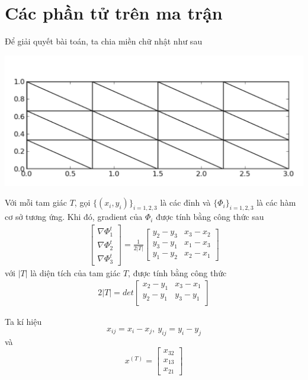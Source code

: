 \documentclass[14pt]{extreport}
\begin{document}
{\section{Các phần tử trên ma trận}
Để giải quyết bài toán, ta chia miền chữ nhật như sau
\begin{center}
\includegraphics[scale=0.5]{grid_fem.PNG}
\end{center}
Với mỗi tam giác $T$, gọi $\{ (x_i, y_i) \}_{i = 1,2,3}$ là các đỉnh và $\{ \Phi_i \}_{i =1,2,3}$ là các hàm cơ sở tương ứng. Khi đó, gradient của $\Phi_i$ được tính bằng công thức sau
\begin{equation} \label{eq20}
\begin{split}
  \begin{bmatrix}
    \nabla \Phi_1^t \\
    \nabla \Phi_2^t \\
	\nabla \Phi_3^t
  \end{bmatrix}
  =
  \frac{1}{2 |T|}
  \begin{bmatrix}
    y_2 - y_3 & x_3 - x_2 \\
    y_3 - y_1 & x_1 - x_3 \\
    y_1 - y_2 & x_2 - x_1
  \end{bmatrix}
\end{split}
\end{equation}
với $|T|$ là diện tích của tam giác $T$, được tính bằng công thức
\begin{equation} \label{eq21}
\begin{split}
2 |T| = det
\begin{bmatrix}
    x_2 - y_1 & x_3 - x_1 \\
    y_2 - y_1 & y_3 - y_1 \\
  \end{bmatrix}
\end{split}
\end{equation}

Ta kí hiệu
$$x_{ij} = x_i - x_j, \ y_{ij} = y_i - y_j$$
và
\[
x^{(T)}
=
\begin{bmatrix}
    x_{32} \\
    x_{13} \\
    x_{21}
\end{bmatrix}
\]

}
\end{document}
